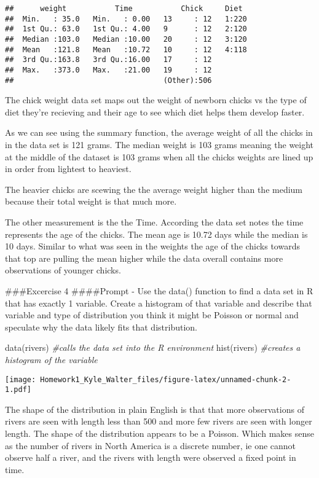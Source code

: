 \documentclass[
]{article}
\newenvironment{Shaded}{\begin{snugshade}}{\end{snugshade}}
\newcommand{\CommentTok}[1]{\textcolor[rgb]{0.56,0.35,0.01}{\textit{#1}}}
\newcommand{\FunctionTok}[1]{\textcolor[rgb]{0.00,0.00,0.00}{#1}}
\newcommand{\NormalTok}[1]{#1}
\begin{document}
\begin{verbatim}
##      weight           Time           Chick     Diet   
##  Min.   : 35.0   Min.   : 0.00   13     : 12   1:220  
##  1st Qu.: 63.0   1st Qu.: 4.00   9      : 12   2:120  
##  Median :103.0   Median :10.00   20     : 12   3:120  
##  Mean   :121.8   Mean   :10.72   10     : 12   4:118  
##  3rd Qu.:163.8   3rd Qu.:16.00   17     : 12          
##  Max.   :373.0   Max.   :21.00   19     : 12          
##                                  (Other):506
\end{verbatim}

The chick weight data set maps out the weight of newborn chicks vs the
type of diet they're recieving and their age to see which diet helps
them develop faster.

As we can see using the summary function, the average weight of all the
chicks in in the data set is 121 grams. The median weight is 103 grams
meaning the weight at the middle of the dataset is 103 grams when all
the chicks weights are lined up in order from lightest to heaviest.

The heavier chicks are scewing the the average weight higher than the
medium because their total weight is that much more.

The other measurement is the the Time. According the data set notes the
time represents the age of the chicks. The mean age is 10.72 days while
the median is 10 days. Similar to what was seen in the weights the age
of the chicks towards that top are pulling the mean higher while the
data overall contains more observations of younger chicks.

\#\#\#Excercise 4 \#\#\#\#Prompt - Use the data() function to find a
data set in R that has exactly 1 variable. Create a histogram of that
variable and describe that variable and type of distribution you think
it might be Poisson or normal and speculate why the data likely fits
that distribution.

\begin{Shaded}
\begin{Highlighting}[]
\FunctionTok{data}\NormalTok{(rivers) }\CommentTok{\#calls the data set into the R environment}
\FunctionTok{hist}\NormalTok{(rivers) }\CommentTok{\#creates a histogram of the variable}
\end{Highlighting}
\end{Shaded}

\texttt{[image: Homework1\_Kyle\_Walter\_files/figure-latex/unnamed-chunk-2-1.pdf]}

The shape of the distribution in plain English is that that more
observations of rivers are seen with length less than 500 and more few
rivers are seen with longer length. The shape of the distribution
appears to be a Poisson. Which makes sense as the number of rivers in
North America is a discrete number, ie one cannot observe half a river,
and the rivers with length were observed a fixed point in time.
\end{document}
